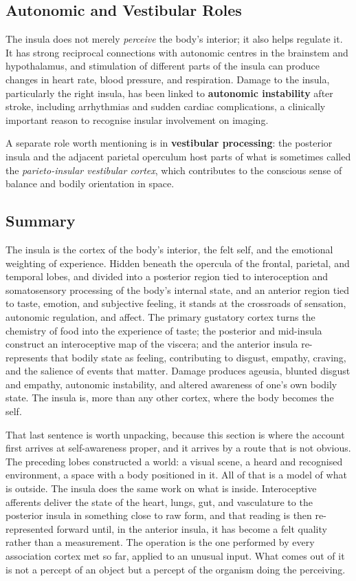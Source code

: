 \documentclass[11pt]{article}
\begin{document}
\subsection{Autonomic and Vestibular Roles}

The insula does not merely \textit{perceive} the body's interior; it also helps regulate it. It has strong reciprocal connections with autonomic centres in the brainstem and hypothalamus, and stimulation of different parts of the insula can produce changes in heart rate, blood pressure, and respiration. Damage to the insula, particularly the right insula, has been linked to \textbf{autonomic instability} after stroke, including arrhythmias and sudden cardiac complications, a clinically important reason to recognise insular involvement on imaging.

A separate role worth mentioning is in \textbf{vestibular processing}: the posterior insula and the adjacent parietal operculum host parts of what is sometimes called the \textit{parieto-insular vestibular cortex}, which contributes to the conscious sense of balance and bodily orientation in space.

\subsection{Summary}

The insula is the cortex of the body's interior, the felt self, and the emotional weighting of experience. Hidden beneath the opercula of the frontal, parietal, and temporal lobes, and divided into a posterior region tied to interoception and somatosensory processing of the body's internal state, and an anterior region tied to taste, emotion, and subjective feeling, it stands at the crossroads of sensation, autonomic regulation, and affect. The primary gustatory cortex turns the chemistry of food into the experience of taste; the posterior and mid-insula construct an interoceptive map of the viscera; and the anterior insula re-represents that bodily state as feeling, contributing to disgust, empathy, craving, and the salience of events that matter. Damage produces ageusia, blunted disgust and empathy, autonomic instability, and altered awareness of one's own bodily state. The insula is, more than any other cortex, where the body becomes the self.

That last sentence is worth unpacking, because this section is where the account first arrives at self-awareness proper, and it arrives by a route that is not obvious. The preceding lobes constructed a world: a visual scene, a heard and recognised environment, a space with a body positioned in it. All of that is a model of what is outside. The insula does the same work on what is inside. Interoceptive afferents deliver the state of the heart, lungs, gut, and vasculature to the posterior insula in something close to raw form, and that reading is then re-represented forward until, in the anterior insula, it has become a felt quality rather than a measurement. The operation is the one performed by every association cortex met so far, applied to an unusual input. What comes out of it is not a percept of an object but a percept of the organism doing the perceiving.
\end{document}
